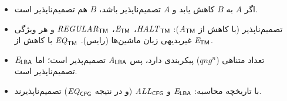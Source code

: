 \begin{summary}
\begin{itemize}
\item اگر $A$ به $B$ کاهش یابد و $A$ تصمیم‌ناپذیر باشد، $B$ هم تصمیم‌ناپذیر است.
\item تصمیم‌ناپذیر (با کاهش از $\mathit{A}_{\mathsf{TM}}$): $\mathit{HALT}_{\mathsf{TM}}$، $\mathit{E}_{\mathsf{TM}}$، $\mathit{REGULAR}_{\mathsf{TM}}$ و هر ویژگی غیربدیهی زبان ماشین‌ها (رایس). $\mathit{EQ}_{\mathsf{TM}}$ با کاهش از $\mathit{E}_{\mathsf{TM}}$.
\item {} تعداد متناهی ($qng^n$) پیکربندی دارد، پس $\mathit{A}_{\mathsf{LBA}}$ تصمیم‌پذیر است؛ اما $\mathit{E}_{\mathsf{LBA}}$ تصمیم‌ناپذیر است.
\item با تاریخچه محاسبه: $\mathit{E}_{\mathsf{LBA}}$ و $\mathit{ALL}_{\mathsf{CFG}}$ (و در نتیجه $\mathit{EQ}_{\mathsf{CFG}}$) تصمیم‌ناپذیرند.
\end{itemize}
\end{summary}
